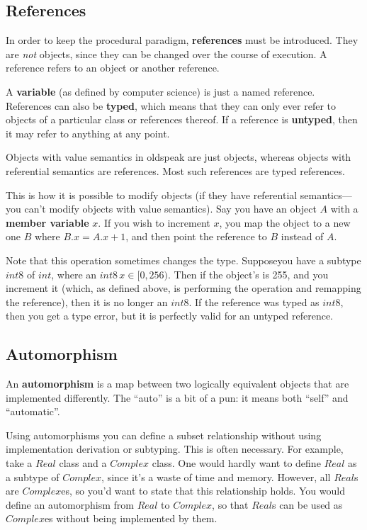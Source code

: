\documentclass[12pt]{article}
\begin{document}
\subsection{References}

In order to keep the procedural paradigm, \textbf{references} must be
introduced.  They are \textit{not} objects, since they can be changed
over the course of execution.  A reference refers to an object or
another reference.

A \textbf{variable} (as defined by computer science) is just a named
reference.  References can also be \textbf{typed}, which means that they
can only ever refer to objects of a particular class or references
thereof.  If a reference is \textbf{untyped}, then it may refer to
anything at any point.

Objects with value semantics in oldspeak are just objects, whereas
objects with referential semantics are references.  Most such references
are typed references.

This is how it is possible to modify objects (if they have referential
semantics---you can't modify objects with value semantics).  Say you
have an object $A$ with a \textbf{member variable} $x$.  If you wish to
increment $x$, you map the object to a new one $B$ where $B.x = A.x +
1$, and then point the reference to $B$ instead of $A$.

Note that this operation sometimes changes the type.  Supposeyou have a
subtype $\mathit{int8}$ of $\mathit{int}$, where an $\mathit{int8}\,x
\in [0,256)$.  Then if the object's is 255, and you increment it (which,
as defined above, is performing the operation and remapping the
reference), then it is no longer an $\mathit{int8}$.  If the reference
was typed as $\mathit{int8}$, then you get a type error, but it is
perfectly valid for an untyped reference.

\subsection{Automorphism}

An \textbf{automorphism} is a map between two logically equivalent
objects that are implemented differently.  The ``auto'' is a bit of a
pun: it means both ``self'' and ``automatic''.  

Using automorphisms you can define a subset relationship without using
implementation derivation or subtyping.  This is often necessary.  For
example, take a $\mathit{Real}$ class and a $\mathit{Complex}$ class.
One would hardly want to define $\mathit{Real}$ as a subtype of
$\mathit{Complex}$, since it's a waste of time and memory.  However, all
$\mathit{Real}$s are $\mathit{Complex}$es, so you'd want to state that
this relationship holds.  You would define an automorphism from
$\mathit{Real}$ to $\mathit{Complex}$, so that $\mathit{Real}$s can be
used as $\mathit{Complex}$es without being implemented by them.
\end{document}
